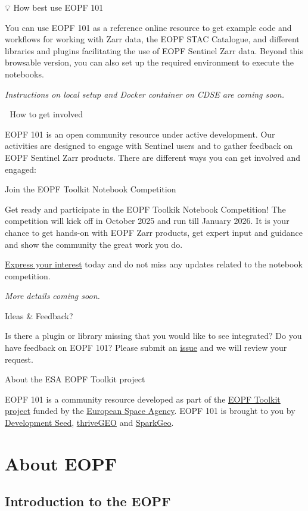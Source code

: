 \documentclass[
  letterpaper,
  DIV=11,
  numbers=noendperiod]{scrreprt}
\begin{document}
💡 How best use EOPF 101

You can use EOPF 101 as a reference online resource to get example code
and workflows for working with Zarr data, the EOPF STAC Catalogue, and
different libraries and plugins facilitating the use of EOPF Sentinel
Zarr data. Beyond this browsable version, you can also set up the
required environment to execute the notebooks.

\emph{Instructions on local setup and Docker container on CDSE are
coming soon.}

📢 How to get involved

EOPF 101 is an open community resource under active development. Our
activities are designed to engage with Sentinel users and to gather
feedback on EOPF Sentinel Zarr products. There are different ways you
can get involved and engaged:

Join the EOPF Toolkit Notebook Competition

Get ready and participate in the EOPF Toolkik Notebook Competition! The
competition will kick off in October 2025 and run till January 2026. It
is your chance to get hands-on with EOPF Zarr products, get expert input
and guidance and show the community the great work you do.

\href{https://thrivegeo.com/eopf-toolkit-competition/}{Express your
interest} today and do not miss any updates related to the notebook
competition.

\emph{More details coming soon.}

Ideas \& Feedback?

Is there a plugin or library missing that you would like to see
integrated? Do you have feedback on EOPF 101? Please submit an
\href{https://github.com/eopf-toolkit/eopf-101/issues}{issue} and we
will review your request.

About the ESA EOPF Toolkit project

EOPF 101 is a community resource developed as part of the
\href{https://github.com/eopf-toolkit}{EOPF Toolkit project} funded by
the \href{https://www.esa.int/}{European Space Agency}. EOPF 101 is
brought to you by \href{https://developmentseed.org/}{Development Seed},
\href{https://www.thrivegeo.com}{thriveGEO} and
\href{https://sparkgeo.com/}{SparkGeo}.

\part{\textbf{About EOPF}}

\chapter{Introduction to the EOPF}\label{introduction-to-the-eopf}
\end{document}
